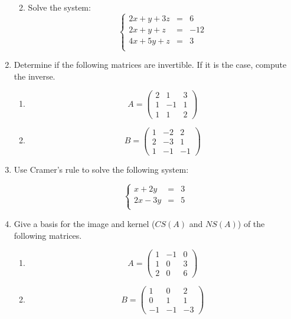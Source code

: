 \documentclass{article}
\begin{document}
\begin{enumerate}
\begin{enumerate}
\vskip 3in

\item Solve the system:
\[ \left\{ 
\begin{array}{ccc} 
2x + y + 3 z & = & 6 \\
2x + y +   z & = & -12 \\
4x + 5y + z  & = & 3 \\
\end{array}
\right.
\]
\end{enumerate}

\newpage

\item Determine if the following matrices are invertible. If it is the case, compute the inverse.
\begin{enumerate}
\item \[ A =\begin{pmatrix} 2 & 1 & 3 \\ 1 & -1 & 1 \\ 1 & 1 & 2 \end{pmatrix}\]
\item \[ B =\begin{pmatrix} 1 & -2 & 2 \\ 2 & -3 & 1 \\ 1 & -1 & -1\end{pmatrix} \]
\end{enumerate}

\vskip 3in

\item Use Cramer's rule to solve the following system:
 
\[\left\{\begin{array}{ccc}
x+2y  & = & 3 \\
2x-3y  & = & 5 \\
\end{array}\right.\]
\newpage

\item Give a basis for the image and kernel ($CS(A)$ and $NS(A)$) of the following matrices. 
\begin{enumerate}
\item \[A= \begin{pmatrix} 1 & -1 & 0 \\ 1 & 0 & 3 \\ 2 & 0 & 6 \end{pmatrix} \]
\vskip 3in
\item \[B= \begin{pmatrix} 1 & 0 & 2 \\ 0 & 1 & 1 \\ -1 & -1 & -3 \end{pmatrix} \]
\end{enumerate}


\end{enumerate}
\end{document}
